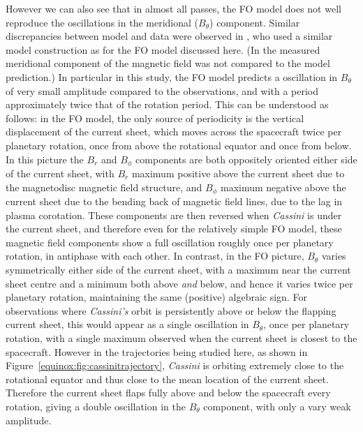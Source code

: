 However we can also see that in almost all passes, the FO model does not well reproduce the oscillations in the meridional ($B_{\theta}$) component. Similar discrepancies between model and data were observed in \citet{achilleos2014}, who used a similar model construction as for the FO model discussed here. (In \citet{arridge2011} the measured meridional component of the magnetic field was not compared to the model prediction.) In particular in this study, the FO model predicts a oscillation in $B_{\theta}$ of very small amplitude compared to the observations, and with a period approximately twice that of the rotation period. This can be understood as follows: in the FO model, the only source of periodicity is the vertical displacement of the current sheet, which moves across the spacecraft twice per planetary rotation, once from above the rotational equator and once from below. In this picture the $B_{r}$ and $B_{\phi}$ components are both oppositely oriented either side of the current sheet, with $B_{r}$ maximum positive above the current sheet due to the magnetodisc magnetic field structure, and $B_{\phi}$ maximum negative above the current sheet due to the bending back of magnetic field lines, due to the lag in plasma corotation. These components are then reversed when \textit{Cassini} is under the current sheet, and therefore even for the relatively simple FO model, these magnetic field components show a full oscillation roughly once per planetary rotation, in antiphase with each other. In contrast, in the FO picture, $B_{\theta}$ varies symmetrically either side of the current sheet, with a maximum near the current sheet centre and a minimum both above \textit{and} below, and hence it varies twice per planetary rotation, maintaining the same (positive) algebraic sign. For observations where \textit{Cassini's} orbit is persistently above or below the flapping current sheet, this would appear as a single oscillation in $B_{\theta}$, once per planetary rotation, with a single maximum observed when the current sheet is closest to the spacecraft. However in the trajectories being studied here, as shown in Figure~\ref{equinox:fig:cassinitrajectory}, \textit{Cassini} is orbiting extremely close to the rotational equator and thus close to the mean location of the current sheet. Therefore the current sheet flaps fully above and below the spacecraft every rotation, giving a double oscillation in the $B_{\theta}$ component, with only a vary weak amplitude.

